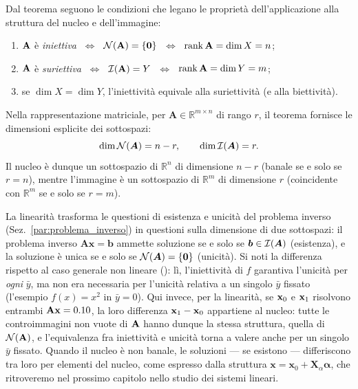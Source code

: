 \noindent Dal teorema seguono le condizioni che legano le propriet\`a dell'applicazione alla struttura del nucleo e dell'immagine:
\begin{enumerate}[label=(\roman*)]
	\item $\mathbf{A}$ \`e \textit{iniettiva} $\;\Longleftrightarrow\;$ $\mathcal{N}(\mathbf{A})=\{\mathbf{0}\}$ $\;\Longleftrightarrow\;$ $\operatorname{rank}\mathbf{A}=\dim X =n$;
	\item $\mathbf{A}$ \`e \textit{suriettiva} $\;\Longleftrightarrow\;$ $\mathcal{I}(\mathbf{A})=Y$ $\;\Longleftrightarrow\;$ $\operatorname{rank}\mathbf{A}=\dim Y = m$;
	\item se $\dim X=\dim Y$, l'iniettivit\`a equivale alla suriettivit\`a (e alla biettivit\`a).
\end{enumerate}

\noindent Nella rappresentazione matriciale, per $\bm{A}\in\mathbb{R}^{m\times n}$ di rango $r$, il teorema fornisce le dimensioni esplicite dei sottospazi:
\begin{equation}
	\dim\mathcal{N}(\bm{A}) = n - r, \qquad \dim\mathcal{I}(\bm{A}) = r.
\end{equation}
Il nucleo \`e dunque un sottospazio di $\mathbb{R}^n$ di dimensione $n-r$ (banale se e solo se $r=n$), mentre l'immagine \`e un sottospazio di $\mathbb{R}^m$ di dimensione $r$ (coincidente con $\mathbb{R}^m$ se e solo se $r=m$).

\begin{oss}
	La linearit\`a trasforma le questioni di esistenza e unicit\`a del problema inverso (Sez.~\ref{par:problema_inverso}) in questioni sulla dimensione di due sottospazi: il problema inverso $\bm{A}\bm{x}=\bm{b}$ ammette soluzione se e solo se $\bm{b} \in \mathcal{I}(\bm{A})$ (esistenza), e la soluzione \`e unica se e solo se $\mathcal{N}(\bm{A})=\{\bm{0}\}$ (unicit\`a). Si noti la differenza rispetto al caso generale non lineare (): l\`i, l'iniettivit\`a di $f$ garantiva l'unicit\`a per \textit{ogni} $\bar y$, ma non era necessaria per l'unicit\`a relativa a un singolo $\bar y$ fissato (l'esempio $f(x)=x^2$ in $\bar y=0$). Qui invece, per la linearit\`a, se $\mathbf{x}_0$ e $\mathbf{x}_1$ risolvono entrambi $\mathbf{A}\mathbf{x}=0.10$, la loro differenza $\mathbf{x}_1-\mathbf{x}_0$ appartiene al nucleo: tutte le controimmagini non vuote di $\mathbf{A}$ hanno dunque la stessa struttura, quella di $\mathcal{N}(\mathbf{A})$, e l'equivalenza fra iniettivit\`a e unicit\`a torna a valere anche per un singolo $\bar y$ fissato. Quando il nucleo \`e non banale, le soluzioni --- se esistono --- differiscono tra loro per elementi del nucleo, come espresso dalla struttura $\bm{x} = \bm{x}_0 + \bm{X}_\alpha\bm{\alpha}$, che ritroveremo nel prossimo capitolo nello studio dei sistemi lineari.
\end{oss}


